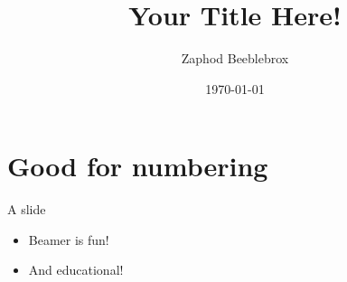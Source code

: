 \documentclass[xcolor=dvipsnames]{beamer}
\title[YTH!]{Your Title Here!}
\author{Zaphod Beeblebrox}
\institute[ZBI]{}
\date{\today}
\begin{document}
{\nologo
\begin{frame}
\titlepage
\end{frame}
}


\section*{Good for numbering}

\begin{frame}{A slide}

\begin{itemize}
	\item Beamer is fun!
	\item And educational!
\end{itemize}

\end{frame}
\end{document}
